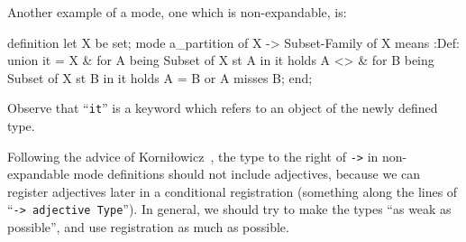 \begin{node}[Modes]
\begin{node}
\begin{node}\label{mizar-000U}%
Another example of a mode, one which is non-expandable, is:
\begin{mizar}
definition
  let X be set;
  mode a_partition of X -> Subset-Family of X means :Def:
  union it = X
  & for A being Subset of X st A in it holds A <> {}
  & for B being Subset of X st B in it holds A = B or A misses B;
end;
\end{mizar}
Observe that ``\texttt{it}'' is a keyword which refers to an object of
the newly defined type.
\end{node}
\end{node}

\begin{node}\label{mizar-0019}%
Following the advice of Korni\l{}owicz~\cite{Korniowicz2009-KORHTD},
the type to the right of \texttt{->} in non-expandable mode definitions
should not include adjectives, because we can register adjectives later
in a conditional registration (something along the lines of ``\texttt{-> adjective Type}'').
In general, we should try to make the types ``as weak as possible'', and
use registration as much as possible.
\end{node}
\end{node}

